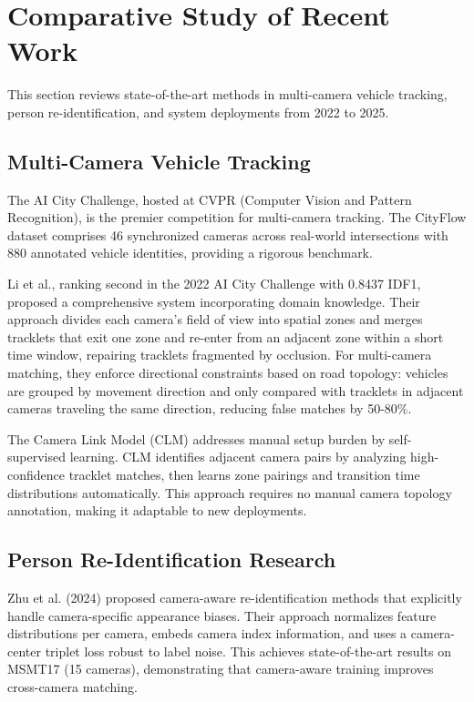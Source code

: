 \section{Comparative Study of Recent Work}

This section reviews state-of-the-art methods in multi-camera vehicle tracking, person re-identification, and system deployments from 2022 to 2025.

\subsection{Multi-Camera Vehicle Tracking}

The AI City Challenge, hosted at CVPR (Computer Vision and Pattern Recognition), is the premier competition for multi-camera tracking. The CityFlow dataset comprises 46 synchronized cameras across real-world intersections with 880 annotated vehicle identities, providing a rigorous benchmark.

Li et al., ranking second in the 2022 AI City Challenge with 0.8437 IDF1, proposed a comprehensive system incorporating domain knowledge. Their approach divides each camera's field of view into spatial zones and merges tracklets that exit one zone and re-enter from an adjacent zone within a short time window, repairing tracklets fragmented by occlusion. For multi-camera matching, they enforce directional constraints based on road topology: vehicles are grouped by movement direction and only compared with tracklets in adjacent cameras traveling the same direction, reducing false matches by 50-80\%.

The Camera Link Model (CLM) addresses manual setup burden by self-supervised learning. CLM identifies adjacent camera pairs by analyzing high-confidence tracklet matches, then learns zone pairings and transition time distributions automatically. This approach requires no manual camera topology annotation, making it adaptable to new deployments.

\subsection{Person Re-Identification Research}

Zhu et al. (2024) proposed camera-aware re-identification methods that explicitly handle camera-specific appearance biases. Their approach normalizes feature distributions per camera, embeds camera index information, and uses a camera-center triplet loss robust to label noise. This achieves state-of-the-art results on MSMT17 (15 cameras), demonstrating that camera-aware training improves cross-camera matching.

